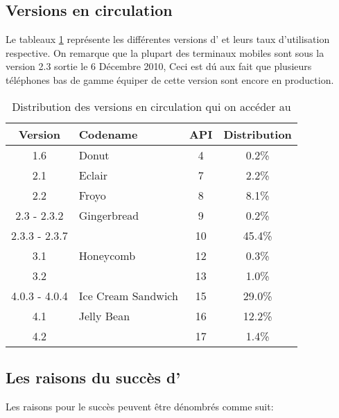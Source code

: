 
\subsection{Versions \android{} en circulation}

Le tableaux \ref{tab:androidversion} représente les différentes versions
d'\android{} et leurs taux d'utilisation respective. On remarque que
la plupart des terminaux mobiles \android{} sont sous la version 2.3
 sortie le 6 Décembre 2010, Ceci est dú aux fait que
plusieurs téléphones bas de gamme équiper de cette version sont encore
en production.

\begin{table}[H]
\centering
\begin{tabular}{|c|l|c|c|}
\hline
\textsf{Version} & \textsf{Codename} & \textsf{API} &
\textsf{Distribution}\\
\hline
1.6 & Donut & 4 & 0.2\%\\
\hline
2.1 & Eclair & 7 & 2.2\%\\
\hline
2.2 & Froyo & 8 & 8.1\%\\
\hline
2.3 - 2.3.2 & Gingerbread & 9 & 0.2\% \\
\cline{1-1}\cline{3-4}
2.3.3 - 2.3.7 & & 10 & 45.4\%\\
\hline
3.1 & Honeycomb & 12 & 0.3\%\\
\cline{1-1}\cline{3-4}
3.2 & & 13 & 1.0\%\\
\hline
4.0.3 - 4.0.4 & Ice Cream Sandwich & 15 & 29.0\%\\
\hline
4.1 & Jelly Bean & 16 & 12.2\%\\
\cline{1-1}\cline{3-4}
4.2 & & 17 & 1.4\%\\
\hline
\end{tabular}
\caption{Distribution des versions \android{} en circulation qui on
accéder au \protect\footnotemark[5]}
\label{tab:androidversion}
\end{table}


\subsection[Les raisons du succès d'\android{}]{Les raisons du succès d'\android{}\cite{lft:growth_android}}

Les raisons pour le succès \android{} peuvent être
dénombrés comme suit:


